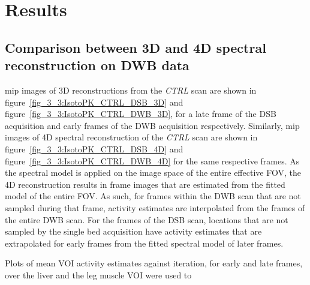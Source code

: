 \section{Results}
\subsection{Comparison between 3D and 4D spectral reconstruction on DWB data}
\Gls{mip} images of 3D reconstructions from the \textit{CTRL} scan are shown in figure~\ref{fig_3_3:IsotoPK_CTRL_DSB_3D} and figure~\ref{fig_3_3:IsotoPK_CTRL_DWB_3D}, for a late frame of the DSB acquisition and early frames of the DWB acquisition respectively. 
Similarly, \gls{mip} images of 4D spectral reconstruction of the \textit{CTRL} scan are shown in figure~\ref{fig_3_3:IsotoPK_CTRL_DSB_4D} and figure~\ref{fig_3_3:IsotoPK_CTRL_DWB_4D} for the same respective frames. 
As the spectral model is applied on the image space of the entire effective FOV, the 4D reconstruction results in frame images that are estimated from the fitted model of the entire FOV. As such, for frames within the DWB scan that are not sampled during that frame, activity estimates are interpolated from the frames of the entire DWB scan. For the frames of the DSB scan, locations that are not sampled by the single bed acquisition have activity estimates that are extrapolated for early frames from the fitted spectral model of later frames.

Plots of mean VOI activity estimates against iteration, for early and late frames, over the liver and the leg muscle VOI were used to 

